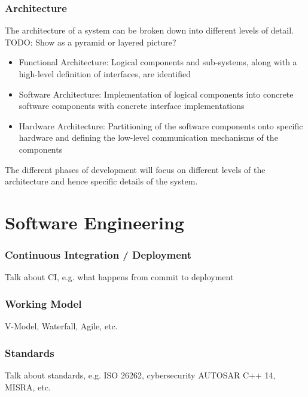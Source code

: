 \documentclass[aspectratio=169]{beamer}
\begin{document}
\begin{frame}
\frametitle{Architecture}
The architecture of a system can be broken down into different levels
of detail.\\
TODO: Show as a pyramid or layered picture?\\
\begin{itemize}
    \item Functional Architecture: Logical components and sub-systems, along
        with a high-level definition of interfaces, are identified
    \item Software Architecture: Implementation of logical components into
        concrete software components with concrete interface implementations
    \item Hardware Architecture: Partitioning of the software components onto
        specific hardware and defining the low-level communication mechanisms
        of the components
\end{itemize}
The different phases of development will focus on different levels of
the architecture and hence specific details of the system.
\end{frame}





\section{Software Engineering}

\begin{frame}
\frametitle{Continuous Integration / Deployment}
Talk about CI, e.g. what happens from commit to deployment
\end{frame}

\begin{frame}
\frametitle{Working Model}
V-Model, Waterfall, Agile, etc.
\end{frame}

\begin{frame}
\frametitle{Standards}
Talk about standards, e.g. ISO 26262, cybersecurity AUTOSAR C++ 14, MISRA, etc.
\end{frame}
\end{document}
